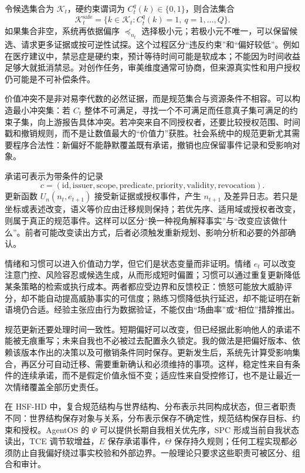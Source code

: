 令候选集合为 $\mathcal K_t$，硬约束谓词为 $C_t^q(k)\in\{0,1\}$，则合法集合
\begin{equation}
    \mathcal K_t^{\mathrm{safe}}
    =\{k\in\mathcal K_t:C_t^q(k)=1,\ q=1,\ldots,Q\}.
\end{equation}
如果集合非空，系统再依据偏序 $\preceq_{n_t}$ 选择极小元；若极小元不唯一，可以保留候选、请求更多证据或按可逆性试探。这个过程区分“违反约束”和“偏好较低”。例如在医疗建议中，禁忌症是硬约束，预计等待时间可能是软成本；不能因为时间收益足够大就抵消禁忌。对创作任务，审美维度通常可协商，但来源真实性和用户授权仍可能是不可补偿条件。

价值冲突不是非对易李代数的必然证据，而是规范集合与资源条件不相容。可以构造最小冲突集：若 $C_t$ 整体不可满足，寻找一个不可满足而任意真子集可满足的约束子集，向上游报告具体冲突。若冲突来自不同授权者，还要比较授权范围、时间戳和撤销规则，而不是让数值最大的“价值力”获胜。社会系统中的规范更新尤其需要程序合法性：新偏好不能静默覆盖既有承诺，撤销也应保留事件记录和受影响对象。

承诺可表示为带条件的记录
\begin{equation}
    c=(\mathrm{id},\mathrm{issuer},\mathrm{scope},\mathrm{predicate},
       \mathrm{priority},\mathrm{validity},\mathrm{revocation}).
\end{equation}
更新函数 $U_n(n_t,e_{t+1})$ 接受新证据或授权事件，产生 $n_{t+1}$ 及差异日志。若只是坐标或表述改变，语义等价应由迁移规则保持；若优先序、适用域或授权者改变，则属于真正的规范事件。这样可以区分“换一种视角解释事实”与“改变应该做什么”。前者可能改变读出方式，后者必须触发重新规划、影响分析和必要的外部确认。

情绪和习惯可以进入价值动力学，但它们是状态变量而非证明。情绪 $e_t$ 可以改变注意门控、风险容忍或候选生成，从而形成短时偏置；习惯可以通过重复更新降低某条策略的检索或执行成本。两者都应受边界和反馈校正：愤怒可能放大威胁评分，却不能自动提高威胁事实的可信度；熟练习惯降低执行延迟，却不能证明在新语境仍合适。经验主张应由行为数据验证，不能仅由“场曲率”或“相位”措辞推出。

规范更新还要处理时间一致性。短期偏好可以改变，但已经据此影响他人的承诺不能被无痕重写；未来自我也不必被过去配置永久锁定。我的做法是把偏好版本、依赖该版本作出的决策以及可撤销条件同时保存。更新发生后，系统先计算受影响集合，再区分可自动迁移、需要重新确认和必须维持的事项。这样，稳定性来自有条件的连续承诺，而不是假定价值永恒不变；适应性来自受控修订，也不是让最近一次情绪覆盖全部历史责任。

在 HSF-HD 中，复合规范结构与世界结构、分布表示共同构成状态，但三者职责不同：世界结构保存对象与关系，分布表示保存不确定性，规范结构保存目标、约束和授权。AgentOS 的 $\Psi$ 可以提供长期自我相关优先序，SPC 形成当前自我状态读出，TCE 调节软增益，$E$ 保存承诺事件，$\Theta$ 保存持久规则；任何工程实现都必须防止自我偏好绕过事实校验和外部边界。一般理论只要求这些职责可被区分、组合和审计。

